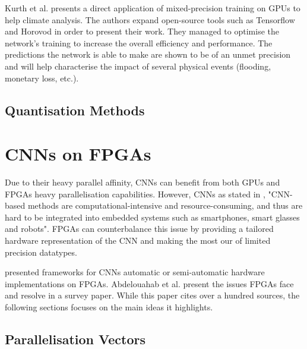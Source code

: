 Kurth et al. \cite{Kurth2018} presents a direct application of mixed-precision training on GPUs to help climate analysis. The authors expand open-source tools such as Tensorflow and Horovod in order to present their work. They managed to optimise the network's training to increase the overall efficiency and performance. The predictions the network is able to make are shown to be of an unmet precision and will help characterise the impact of several physical events (flooding, monetary loss, etc.).


\subsection{Quantisation Methods}



\section{CNNs on FPGAs}

Due to their heavy parallel affinity, CNNs can benefit from both GPUs \cite{Micikevicius2017, Jia2018, Kurth2018} and FPGAs \cite{Park2016, Liang2017, Colangelo2018, Jahanshahi2019, Bacchus2020} heavy parallelisation capabilities.
However, CNNs as stated in \cite{Jahanshahi2019}, "CNN-based methods are computational-intensive and resource-consuming, and thus are hard to be integrated into embedded systems such as smartphones, smart glasses and robots". FPGAs can counterbalance this issue by providing a tailored hardware representation of the CNN and making the most our of limited precision datatypes.

\cite{Zhao2016, Colangelo2018, Jahanshahi2019} presented frameworks for CNNs automatic or semi-automatic hardware implementations on FPGAs. Abdelouahab et al. \cite{Abdelouahab2018} present the issues FPGAs face and resolve in a survey paper. While this paper cites over a hundred sources, the following sections focuses on the main ideas it highlights.


\subsection{Parallelisation Vectors}

